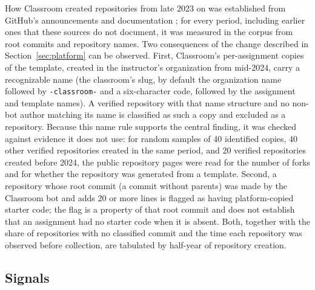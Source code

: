 \documentclass[acmsmall,screen,review,anonymous]{acmart}
\begin{document}
How Classroom created repositories from late 2023 on was established from GitHub's announcements and documentation \citep{github2023classroomchanges, github2024forksbeta, github2024forksga, githubdocs2026template}; for every period, including earlier ones that these sources do not document, it was measured in the corpus from root commits and repository names. Two consequences of the change described in Section~\ref{sec:platform} can be observed. First, Classroom's per-assignment copies of the template, created in the instructor's organization from mid-2024, carry a recognizable name (the classroom's slug, by default the organization name followed by \texttt{-classroom-} and a six-character code, followed by the assignment and template names). A verified repository with that name structure and no non-bot author matching its name is classified as such a copy and excluded as a repository. Because this name rule supports the central finding, it was checked against evidence it does not use: for random samples of 40 identified copies, 40 other verified repositories created in the same period, and 20 verified repositories created before 2024, the public repository pages were read for the number of forks and for whether the repository was generated from a template. Second, a repository whose root commit (a commit without parents) was made by the Classroom bot and adds 20 or more lines is flagged as having platform-copied starter code; the flag is a property of that root commit and does not establish that an assignment had no starter code when it is absent. Both, together with the share of repositories with no classified commit and the time each repository was observed before collection, are tabulated by half-year of repository creation.

\subsection{Signals}
\label{sec:signals}
\end{document}
